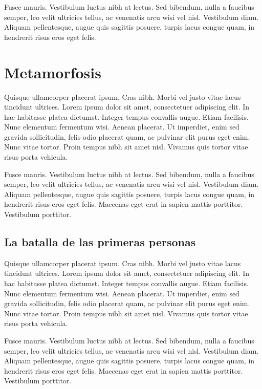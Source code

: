 Fusce mauris. Vestibulum luctus nibh at lectus. Sed bibendum, nulla a faucibus semper, leo velit ultricies tellus, ac venenatis arcu wisi vel nisl. Vestibulum diam. Aliquam pellentesque, augue quis sagittis posuere, turpis lacus congue quam, in hendrerit risus eros eget felis.

\chapter{Metamorfosis}

Quisque ullamcorper placerat ipsum. Cras nibh. Morbi vel justo vitae lacus tincidunt ultrices. Lorem ipsum dolor sit amet, consectetuer adipiscing elit. In hac habitasse platea dictumst. Integer tempus convallis augue. Etiam facilisis. Nunc elementum fermentum wisi. Aenean placerat. Ut imperdiet, enim sed gravida sollicitudin, felis odio placerat quam, ac pulvinar elit purus eget enim. Nunc vitae tortor. Proin tempus nibh sit amet nisl. Vivamus quis tortor vitae risus porta vehicula.

Fusce mauris. Vestibulum luctus nibh at lectus. Sed bibendum, nulla a faucibus semper, leo velit ultricies tellus, ac venenatis arcu wisi vel nisl. Vestibulum diam. Aliquam pellentesque, augue quis sagittis posuere, turpis lacus congue quam, in hendrerit risus eros eget felis. Maecenas eget erat in sapien mattis porttitor. Vestibulum porttitor.

\section{La batalla de las primeras personas}

Quisque ullamcorper placerat ipsum. Cras nibh. Morbi vel justo vitae lacus tincidunt ultrices. Lorem ipsum dolor sit amet, consectetuer adipiscing elit. In hac habitasse platea dictumst. Integer tempus convallis augue. Etiam facilisis. Nunc elementum fermentum wisi. Aenean placerat. Ut imperdiet, enim sed gravida sollicitudin, felis odio placerat quam, ac pulvinar elit purus eget enim. Nunc vitae tortor. Proin tempus nibh sit amet nisl. Vivamus quis tortor vitae risus porta vehicula.

Fusce mauris. Vestibulum luctus nibh at lectus. Sed bibendum, nulla a faucibus semper, leo velit ultricies tellus, ac venenatis arcu wisi vel nisl. Vestibulum diam. Aliquam pellentesque, augue quis sagittis posuere, turpis lacus congue quam, in hendrerit risus eros eget felis. Maecenas eget erat in sapien mattis porttitor. Vestibulum porttitor.

